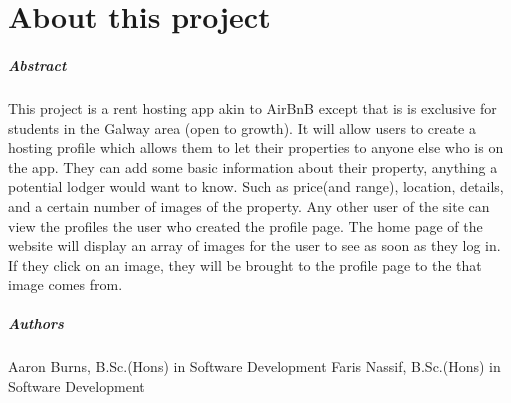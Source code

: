 
\chapter*{About this project}
\paragraph{Abstract}
This project is a rent hosting app akin to AirBnB except that is is exclusive for students in the Galway area (open to growth). It will allow users to create a hosting profile which allows them to let their properties to anyone else who is on the app. They can add some basic information about their property, anything a potential lodger would want to know. Such as price(and range), location, details, and a certain number of images of the property. Any other user of the site can view the profiles the user who created the profile page. The home page of the website will display an array of images for the user to see as soon as they log in. If they click on an image, they will be brought to the profile page to the that image comes from. 


\paragraph{Authors}
Aaron Burns, B.Sc.(Hons) in Software Development
Faris Nassif, B.Sc.(Hons) in Software Development

